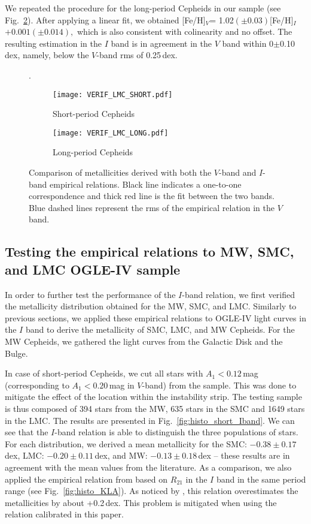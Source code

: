 \documentclass[article]{aa} %
\begin{document}
We repeated the procedure for the long-period Cepheids in our sample (see Fig.~\ref{fig:verif_long}). After applying a linear fit, we obtained [Fe/H]$_V$= 1.02$(\pm0.03)$[Fe/H]$_I$ $+0.001(\pm0.014),$ which is also consistent with colinearity and no offset. The resulting estimation in the $I$ band is in agreement in the $V$ band within 0$\pm$0.10$\,$dex, namely, below the $V$-band rms of 0.25$\,$dex. 


\begin{figure}. 
\begin{subfigure}{0.50\textwidth}
\texttt{[image: VERIF\_LMC\_SHORT.pdf]}
\caption{Short-period Cepheids} \label{fig:verif_short}
\end{subfigure}%

\begin{subfigure}{0.50\textwidth}
\texttt{[image: VERIF\_LMC\_LONG.pdf]}
\caption{Long-period Cepheids} \label{fig:verif_long}
\end{subfigure}
\caption{\small Comparison of metallicities derived with both the $V$-band and $I$-band empirical relations. Black line indicates a one-to-one correspondence and thick red line is the fit between the two bands. Blue dashed lines represent the rms of the empirical relation in the $V$ band.  \label{fig:verif}}
\end{figure}



\subsection{Testing the empirical relations to MW, SMC, and LMC OGLE-IV sample}\label{sect:validity_I}
In order to further test the performance of the $I$-band relation, we first verified the metallicity distribution obtained for the MW, SMC, and LMC. Similarly to previous sections, we applied these empirical relations to OGLE-IV light curves in the $I$ band to derive the metallicity of SMC, LMC, and MW Cepheids. For the MW Cepheids, we gathered the light curves from the Galactic Disk and the Bulge.


In case of short-period Cepheids, we cut all stars with $A_1<0.12\,$mag (corresponding to $A_1<0.20\,$mag in $V$-band) from the sample. This was done to mitigate the effect of the location within the instability strip. The testing sample is thus composed of 394 stars from the MW, 635 stars in the SMC and 1649 stars in the LMC. The results are presented in Fig.~\ref{fig:histo_short_Iband}.
We can see that the $I$-band relation is able to distinguish the three populations of stars. For each distribution, we derived a mean metallicity for the SMC: $-0.38\pm0.17\,$dex, LMC: $-0.20\pm0.11\,$dex, and MW: $-0.13\pm0.18\,$dex -- these results are in agreement with the mean values from the literature. As a comparison, we also applied the empirical relation from \cite{Klagyivik2013} based on $R_{21}$ in the $I$ band in the same period range (see Fig.~\ref{fig:histo_KLA}). As noticed by \cite{Clementini2019}, this relation overestimates the metallicities by about +0.2$\,$dex. This problem is mitigated when using the relation calibrated in this paper.
\end{document}
